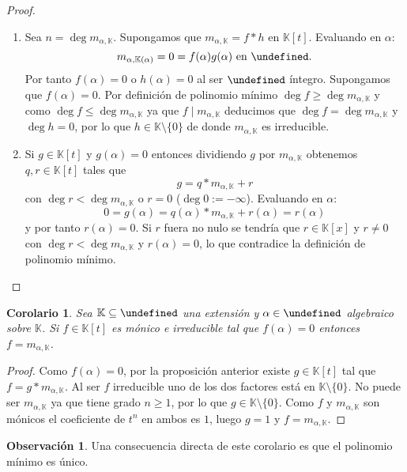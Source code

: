 \documentclass[10pt, spanish]{report}
\newtheorem*{cor}{Corolario}
\theoremstyle{definition}
\newtheorem*{obs}{Observación}
\newcommand{\K}{\mathbb{K}}
\let\L\undefined
\newcommand{\L}{\mathbb{L}}
\renewcommand{\geq}{\geqslant}
\renewcommand{\leq}{\leqslant}
\begin{document}
\begin{proof}\hspace{0pt}
    \begin{enumerate}
        \item Sea $n=\deg{m_{\alpha,\K}}$. Supongamos que $m_{\alpha,\K}=f*h$ en
            $\K[t]$. Evaluando en $\alpha$:
            \[m_{\alpha,\K(\alpha)}=0=f(\alpha)g(\alpha)\text{ en }\L.\]
            Por tanto $f(\alpha)=0$ o $h(\alpha)=0$ al ser $\L$
            íntegro. Supongamos que $f(\alpha)=0$. Por definición de polinomio
            mínimo $\deg{f}\geq\deg{m_{\alpha,\K}}$ y como $\deg{f}\leq
            \deg{m_{\alpha,\K}}$ ya que $f\mid m_{\alpha,\K}$ deducimos que
            $\deg{f}=\deg{m_{\alpha,\K}}$ y $\deg{h}=0$, por lo que
            $h\in\K\setminus\{0\}$ de donde $m_{\alpha,\K}$ es irreducible.
        \item Si $g\in\K[t]$ y $g(\alpha)=0$ entonces dividiendo $g$ por
            $m_{\alpha,\K}$ obtenemos $q,r\in\K[t]$ tales que \[g=q*m_{\alpha,
            \K}+r\] con $\deg{r}<\deg{m_{\alpha,\K}}$ o $r=0$
            ($\deg{0}:=-\infty$). Evaluando en $\alpha$:
            \[0=g(\alpha)=q(\alpha)*m_{\alpha,\K}+r(\alpha)=r(\alpha)\]
            y por tanto $r(\alpha)=0$. Si $r$ fuera no nulo se tendría que
            $r\in\K[x]$ y $r\neq 0$ con $\deg{r}<\deg{m_{\alpha,\K}}$ y
            $r(\alpha) = 0$, lo que contradice la definición de polinomio
            mínimo.
    \end{enumerate}
    \vspace{-1em}
\end{proof}


\begin{cor}
    Sea $\K\subseteq\L$ una extensión y $\alpha\in\L$ algebraico sobre $\K$. Si
    $f\in\K[t]$ es mónico e irreducible tal que $f(\alpha)=0$ entonces
    $f=m_{\alpha,\K}$.
\end{cor}

\begin{proof}
    Como $f(\alpha)=0$, por la proposición anterior existe $g\in\K[t]$ tal que
    $f=g*m_{\alpha,\K}$. Al ser $f$ irreducible uno de los dos factores está en
    $\K\setminus\{0\}$. No puede ser $m_{\alpha,\K}$ ya que tiene grado
    $n\geq1$, por lo que $g\in\K\setminus\{0\}$. Como $f$ y $m_{\alpha,\K}$ son
    mónicos el coeficiente de $t^n$ en ambos es $1$, luego $g=1$ y
    $f=m_{\alpha,\K}$.
\end{proof}

\begin{obs}
    Una consecuencia directa de este corolario es que el polinomio mínimo es
    único.
\end{obs}
\end{document}
